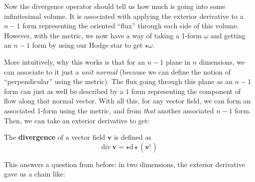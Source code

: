 \documentclass[../master.tex]{subfiles}
\begin{document}
	Now the divergence operator should tell us how much is going into some infinitesimal volume. It is associated with applying the exterior derivative to a $n-1$ form representing the oriented ``flux'' through each side of this volume. However, with the metric, we now have a way of taking a 1-form $\omega$ and getting an $n-1$ form by using our Hodge star to get $\star \omega$. 
	 
	More intuitively, why this works is that for an $n-1$ plane in $n$ dimensions, we can associate to it just a \emph{unit normal} (because we can define the notion of ``perpendicular'' using the metric). The flux going through this plane as an $n-1$ form can just as well be described by a $1$ form representing the component of flow along that normal vector. With all this, for any vector field, we can form an associated 1-form using the metric, and from \emph{that} another associated $n-1$ form. Then, we can take an exterior derivative to get:
	 
	\begin{defn}
		The \textbf{divergence} of a vector field $\mathbf v$ is defined as 
		\begin{equation}
			\mathrm{div} ~ \mathbf v = \star \mathrm d \star (\mathbf v^\flat)
		\end{equation}
	\end{defn} 
	
	This answers a question from before: in two dimensions, the exterior derivative gave us a chain like:
	
\end{document}

